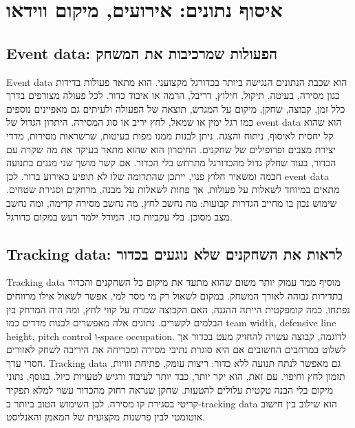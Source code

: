\documentclass[11pt]{report}
\begin{document}
\chapter{איסוף נתונים: אירועים, מיקום ווידאו}
\section{Event data: הפעולות שמרכיבות את המשחק}
Event data הוא שכבת הנתונים הנגישה ביותר בכדורגל מקצועני. הוא מתאר פעולות בדידות כגון מסירה, בעיטה, תיקול, חילוץ, דריבל, הרמה או איבוד כדור. לכל פעולה מצורפים בדרך כלל זמן, קבוצה, שחקן, מיקום על המגרש, תוצאה של הפעולה ולעיתים גם מאפיינים נוספים כמו רגל ימין או שמאל, לחץ יריב או סוג המסירה. היתרון הגדול של event data הוא שהוא קל יחסית לאיסוף, ניתוח והצגה. ניתן לבנות ממנו מפות בעיטות, שרשראות מסירות, מדדי יצירת מצבים ופרופילים של שחקנים. החיסרון הוא שהוא מתאר בעיקר את מה שקרה עם הכדור, בעוד שחלק גדול מהכדורגל מתרחש בלי הכדור. אם קשר מושך שני מגנים בתנועה חכמה ומשאיר חלוץ פנוי, ייתכן שהתרומה שלו לא תופיע כאירוע ברור. לכן event data מתאים במיוחד לשאלות על פעולות, אך פחות לשאלות על מבנה, מרחקים וסגירת שטחים. שימוש נכון בו מחייב הגדרות קבועות: מה נחשב לחץ, מה נחשב מסירה קדימה, ומה נחשב מצב מסוכן. בלי עקביות כזו, המודל ילמד רעש במקום כדורגל.

\section{Tracking data: לראות את השחקנים שלא נוגעים בכדור}
Tracking data מוסיף ממד עמוק יותר משום שהוא מתעד את מיקום כל השחקנים והכדור בתדירות גבוהה לאורך המשחק. במקום לשאול רק מי מסר למי, אפשר לשאול אילו מרווחים נפתחו, כמה קומפקטית הייתה ההגנה, האם הקבוצה שמרה על קווי לחץ, ומה היה המרחק בין הבלמים לקשרים. נתונים אלה מאפשרים לבנות מדדים כמו team width, defensive line height, pitch control ו-space occupation. לדוגמה, קבוצה עשויה להחזיק מעט בכדור אך לשלוט במרחבים החשובים אם היא סוגרת נתיבי מסירה ומכריחה את היריבה לשחק לאזורים חסרי ערך. Tracking data גם מאפשר לנתח תנועה ללא כדור: ריצות עומק, פתיחת זוויות, תזמון לחץ וחיפוי. עם זאת, הוא יקר יותר, כבד יותר לעיבוד ורגיש לטעויות כיול. בנוסף, נתוני מיקום בלי הבנה טקטית עלולים להטעות. שחקן שנראה רחוק מהכדור עשוי למלא תפקיד קריטי בסגירת קו מסירה. לכן השימוש הטוב ביותר ב-tracking data הוא שילוב בין חישוב אוטומטי לבין פרשנות מקצועית של המאמן והאנליסט.
\end{document}
